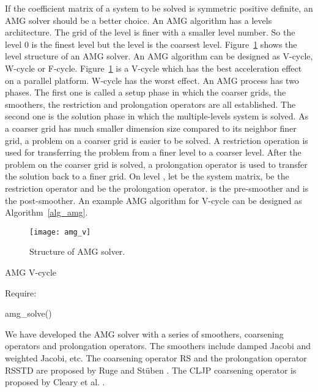 \documentclass[runningheads,a4paper]{llncs}
\begin{document}
{If the coefficient matrix of a system to be solved is symmetric positive definite, an AMG solver should be a better choice. An AMG algorithm has a  levels architecture. The grid of the level is finer with a smaller level number. So the level 0 is the finest level but the level  is the coarsest level. Figure~\ref{fig_amg} shows the level structure of an AMG solver. An AMG algorithm can be designed as V-cycle, W-cycle or F-cycle. Figure~\ref{fig_amg} is a V-cycle which has the best acceleration effect on a parallel platform. W-cycle has the worst effect. An AMG process has two phases. The first one is called a setup phase in which the coarser grids, the smoothers, the restriction and prolongation operators are all established. The second one is the solution phase in which the multiple-levels system is solved. As a coarser grid has much smaller dimension size compared to its neighbor finer grid, a problem on a coarser grid is easier to be solved. A restriction operation is used for transferring the problem from a finer level to a coarser level. After the problem on the coarser grid is solved, a prolongation operator is used to transfer the solution back to a finer grid. On level , let  be the system matrix,  be the restriction operator and  be the prolongation operator.  is the pre-smoother and  is the post-smoother. An example AMG algorithm for V-cycle can be designed as Algorithm~\ref{alg_amg}.

\begin{figure}[tbh]
    \centering
    \texttt{[image: amg\_v]}
    \caption{Structure of AMG solver.}
    \label{fig_amg}
\end{figure}

\begin{algorithm}\caption{AMG V-cycle}
\label{alg_amg}
\begin{algorithmic}\State Require: 
\State

\If {()}
  \State                                 {}
  \State 
  \State                                                {}
  \State amg\_solve()                                                              
  \State                                  {}
  \State                                 {}
\Else
  \State 
\EndIf

\end{algorithmic}
\end{algorithm}

We have developed the AMG solver with a series of smoothers, coarsening operators and prolongation operators. The smoothers include damped Jacobi and weighted Jacobi, etc. The coarsening operator RS and the prolongation operator RSSTD are proposed by Ruge and St\"{u}ben  \cite{Stuben1,Stuben2}. The CLJP coarsening operator is proposed by Cleary et al. \cite{hypre,rsamg}.
}
\end{document}
